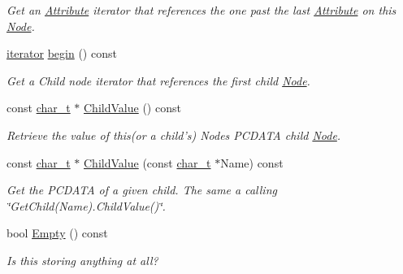 \begin{DoxyCompactItemize}
\begin{DoxyCompactList}\small\item\em Get an \hyperlink{classphys_1_1xml_1_1Attribute}{Attribute} iterator that references the one past the last \hyperlink{classphys_1_1xml_1_1Attribute}{Attribute} on this \hyperlink{classphys_1_1xml_1_1Node}{Node}. \item\end{DoxyCompactList}\item 
\hyperlink{classphys_1_1xml_1_1NodeIterator}{iterator} \hyperlink{classphys_1_1xml_1_1Node_a39a71c0c078f648de0e716ed59a0446a}{begin} () const 
\begin{DoxyCompactList}\small\item\em Get a Child node iterator that references the first child \hyperlink{classphys_1_1xml_1_1Node}{Node}. \item\end{DoxyCompactList}\item 
const \hyperlink{namespacephys_1_1xml_afc87705cd1c2917d87b879715a2d8f6e}{char\_\-t} $\ast$ \hyperlink{classphys_1_1xml_1_1Node_a97363b63a1963e28bf7503c32b0702e5}{ChildValue} () const 
\begin{DoxyCompactList}\small\item\em Retrieve the value of this(or a child's) Nodes PCDATA child \hyperlink{classphys_1_1xml_1_1Node}{Node}. \item\end{DoxyCompactList}\item 
const \hyperlink{namespacephys_1_1xml_afc87705cd1c2917d87b879715a2d8f6e}{char\_\-t} $\ast$ \hyperlink{classphys_1_1xml_1_1Node_aa8ce075bf47cb586b586800576569744}{ChildValue} (const \hyperlink{namespacephys_1_1xml_afc87705cd1c2917d87b879715a2d8f6e}{char\_\-t} $\ast$Name) const 
\begin{DoxyCompactList}\small\item\em Get the PCDATA of a given child. The same a calling \char`\"{}GetChild(Name).ChildValue()\char`\"{}. \item\end{DoxyCompactList}\item 
bool \hyperlink{classphys_1_1xml_1_1Node_a22c00132e42702d16468489ff0bd01d8}{Empty} () const 
\begin{DoxyCompactList}\small\item\em Is this storing anything at all? \item\end{DoxyCompactList}\item 

\end{DoxyCompactItemize}
